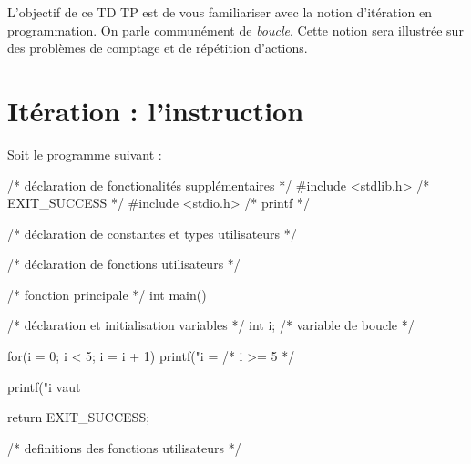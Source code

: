 
\newcommand{\commentaire}[1]{}


\vspace{-0.5cm}
L'objectif de ce TD TP est de vous familiariser avec la notion
d'itération en programmation. On parle communément de
\emph{boucle}. Cette notion sera illustrée sur des problèmes de comptage
et de répétition d'actions.


\section{Itération : l'instruction }


Soit le programme suivant :
{\small
\begin{listing}{1}
/* déclaration de fonctionalités supplémentaires */
#include <stdlib.h> /* EXIT_SUCCESS */
#include <stdio.h> /* printf */

/* déclaration de constantes et types utilisateurs */

/* déclaration de fonctions utilisateurs */

/* fonction principale */
int main()
{
    /* déclaration et initialisation variables */
    int i; /* variable de boucle */

    for(i = 0; i < 5; i = i + 1)
    {
        printf("i = %
    }
    /* i >= 5 */

    printf("i vaut %

    return EXIT_SUCCESS;
}

/* definitions des fonctions utilisateurs */
\end{listing}
}

